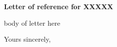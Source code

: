 \documentclass[a4paper]{letter}
\begin{document}
\begin{letter}




 \vspace{-4cm}

\opening{ }

\medskip
\centerline{\bf Letter of reference for   XXXXX}
\medskip



body of letter here

\closing{Yours sincerely,}
\end{letter}
\end{document}
